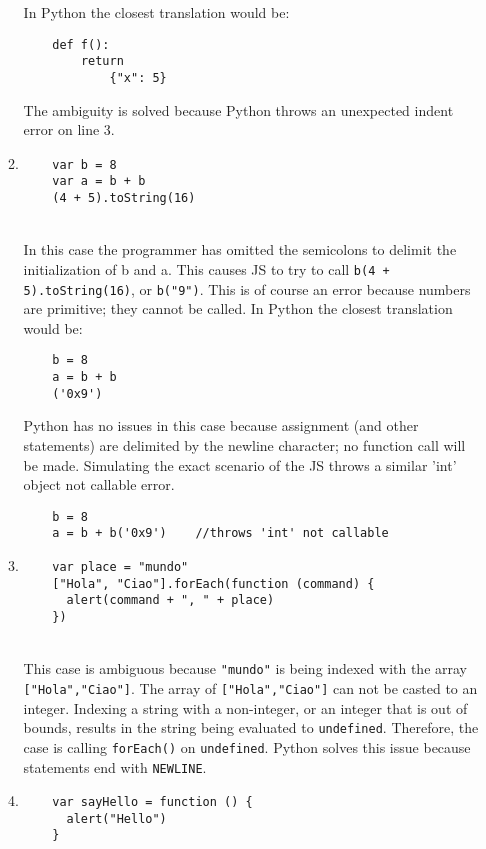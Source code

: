 \documentclass{article}
\begin{document}
\begin{enumerate}
\begin{enumerate}
    In Python the closest translation would be:
    \begin{verbatim}
    def f():
        return
            {"x": 5}    
    \end{verbatim}
    The ambiguity is solved because Python throws an unexpected indent error on line 3. \\
    \item 
    \begin{verbatim}
    var b = 8
    var a = b + b
    (4 + 5).toString(16)
    \end{verbatim} \\
    In this case the programmer has omitted the semicolons to delimit the initialization of b and a. This causes JS to try to call \texttt{b(4 + 5).toString(16)}, or \texttt{b("9")}. This is of course an error because numbers are primitive; they cannot be called.
    In Python the closest translation would be:
    \begin{verbatim}
    b = 8
    a = b + b
    ('0x9')
    \end{verbatim}
    Python has no issues in this case because assignment (and other statements) are delimited by the newline character; no function call will be made. Simulating the exact scenario of the JS throws a similar 'int' object not callable error.
    \begin{verbatim}
    b = 8
    a = b + b('0x9')    //throws 'int' not callable
    \end{verbatim}
    \item 
    \begin{verbatim}
    var place = "mundo"
    ["Hola", "Ciao"].forEach(function (command) {
      alert(command + ", " + place)
    })
    \end{verbatim} \\
    This case is ambiguous because \texttt{"mundo"} is being indexed with the array \texttt{["Hola","Ciao"]}. The array of \texttt{["Hola","Ciao"]} can not be casted to an integer. Indexing a string with a non-integer, or an integer that is out of bounds, results in the string being evaluated to \texttt{undefined}. Therefore, the case is calling \texttt{forEach()} on \texttt{undefined}. Python solves this issue because statements end with \texttt{NEWLINE}. \\
    \item
    \begin{verbatim}
    var sayHello = function () {
      alert("Hello")
    }


\end{verbatim}
\end{enumerate}
\end{enumerate}
\end{document}
